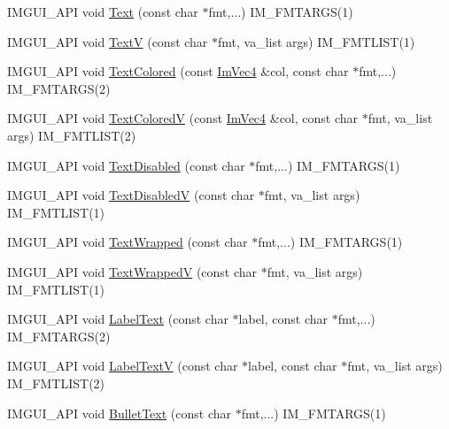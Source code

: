 \begin{DoxyCompactItemize}
\item 
I\+M\+G\+U\+I\+\_\+\+A\+PI void \hyperlink{namespace_im_gui_a9e7b83611fe441d54fad2effb4bf4965}{Text} (const char $\ast$fmt,...) I\+M\+\_\+\+F\+M\+T\+A\+R\+GS(1)
\item 
I\+M\+G\+U\+I\+\_\+\+A\+PI void \hyperlink{namespace_im_gui_a10a0d6362178c2f743092f21e1b6cd20}{TextV} (const char $\ast$fmt, va\+\_\+list args) I\+M\+\_\+\+F\+M\+T\+L\+I\+ST(1)
\item 
I\+M\+G\+U\+I\+\_\+\+A\+PI void \hyperlink{namespace_im_gui_a36ab8fcad68b26863d6e910755de04c2}{Text\+Colored} (const \hyperlink{struct_im_vec4}{Im\+Vec4} \&col, const char $\ast$fmt,...) I\+M\+\_\+\+F\+M\+T\+A\+R\+GS(2)
\item 
I\+M\+G\+U\+I\+\_\+\+A\+PI void \hyperlink{namespace_im_gui_a87c24ece994188a7145d8feecb4439ed}{Text\+ColoredV} (const \hyperlink{struct_im_vec4}{Im\+Vec4} \&col, const char $\ast$fmt, va\+\_\+list args) I\+M\+\_\+\+F\+M\+T\+L\+I\+ST(2)
\item 
I\+M\+G\+U\+I\+\_\+\+A\+PI void \hyperlink{namespace_im_gui_aa96bf14c5fa288e106820aeb4ba7fcb6}{Text\+Disabled} (const char $\ast$fmt,...) I\+M\+\_\+\+F\+M\+T\+A\+R\+GS(1)
\item 
I\+M\+G\+U\+I\+\_\+\+A\+PI void \hyperlink{namespace_im_gui_a5b128d4f12d7e33e95fb9cef7dce027e}{Text\+DisabledV} (const char $\ast$fmt, va\+\_\+list args) I\+M\+\_\+\+F\+M\+T\+L\+I\+ST(1)
\item 
I\+M\+G\+U\+I\+\_\+\+A\+PI void \hyperlink{namespace_im_gui_ad57bb15c599e73b2ccc7c0f7de6e5823}{Text\+Wrapped} (const char $\ast$fmt,...) I\+M\+\_\+\+F\+M\+T\+A\+R\+GS(1)
\item 
I\+M\+G\+U\+I\+\_\+\+A\+PI void \hyperlink{namespace_im_gui_a9019a388cd0c410bcb3d3ae63a008123}{Text\+WrappedV} (const char $\ast$fmt, va\+\_\+list args) I\+M\+\_\+\+F\+M\+T\+L\+I\+ST(1)
\item 
I\+M\+G\+U\+I\+\_\+\+A\+PI void \hyperlink{namespace_im_gui_ad92ccfbc33d448ff40cfcf9219177344}{Label\+Text} (const char $\ast$label, const char $\ast$fmt,...) I\+M\+\_\+\+F\+M\+T\+A\+R\+GS(2)
\item 
I\+M\+G\+U\+I\+\_\+\+A\+PI void \hyperlink{namespace_im_gui_a55e5a7edb676a8f5cd7f65443138a8a0}{Label\+TextV} (const char $\ast$label, const char $\ast$fmt, va\+\_\+list args) I\+M\+\_\+\+F\+M\+T\+L\+I\+ST(2)
\item 
I\+M\+G\+U\+I\+\_\+\+A\+PI void \hyperlink{namespace_im_gui_af8d34d563b17c683943a0fa7bf5807bc}{Bullet\+Text} (const char $\ast$fmt,...) I\+M\+\_\+\+F\+M\+T\+A\+R\+GS(1)
\item 

\end{DoxyCompactItemize}
